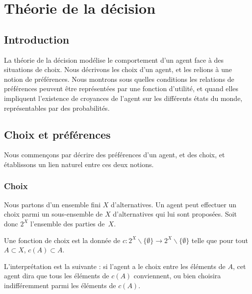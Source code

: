 \chapter{Théorie de la d\'ecision}

\section{Introduction}
La théorie de la décision modélise le comportement d'un agent face
à des situations de choix. Nous décrivons les choix d'un agent, et
les relions à une notion de préférences. Nous montrons sous
quelles conditions les relations de pr\'ef\'erences peuvent \^etre
repr\'esent\'ees par une fonction d'utilit\'e, et quand elles
impliquent l'existence de croyances de l'agent sur les
diff\'erents \'etats du monde, repr\'esentables par des
probabilit\'es.

\section{Choix et préférences}
Nous commençons par décrire des préférences d'un agent, et des
choix, et établissons un lien naturel entre ces deux notions.
\subsection{Choix}
Nous partons d'un ensemble fini $X$ d'alternatives. Un agent peut
effectuer un choix parmi un sous-ensemble de $X$ d'alternatives
qui lui sont proposées.  Soit donc $2^X$ l'ensemble des parties
de~$X$.
\begin{definition}
Une fonction de choix est la donnée de $c\colon
2^X\backslash\{\emptyset\}\to 2^X\backslash\{\emptyset\}$ telle
que pour tout $A\subset X$, $c(A)\subset A$.
\end{definition}
L'interprétation est la suivante : si l'agent a le choix entre les
éléments de $A$, cet agent dira que tous les éléments de $c(A)$
conviennent, ou bien choisira indifféremment parmi les éléments de
$c(A)$.

